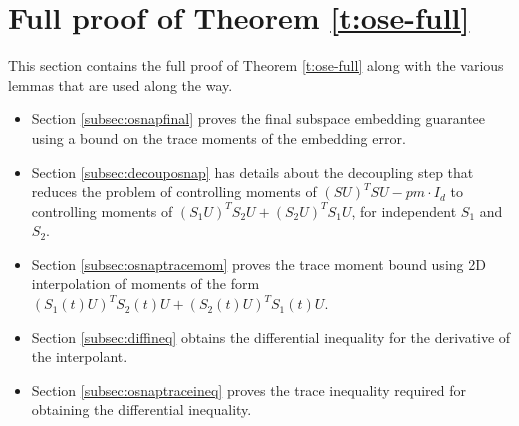 \documentclass[11pt]{amsart}
\numberwithin{equation}{section}
\numberwithin{equation}{section}
\theoremstyle{remark}
\theoremstyle{definition}
\begin{document}
 \section{Full proof of Theorem \ref{t:ose-full}}\label{sec:osnap-proof}

This section contains the full proof of Theorem  \ref{t:ose-full} along with the various lemmas that are used along the way.

\begin{itemize}
    \item Section \ref{subsec:osnapfinal} proves the final subspace embedding guarantee using a bound on the trace moments of the embedding error.
    \item Section \ref{subsec:decouposnap} has details about the decoupling step that reduces the problem of controlling moments of $(SU)^TSU - pm\cdot I_d$ to controlling moments of $(S_1U)^TS_2U+(S_2U)^TS_1U$, for independent $S_1$ and $S_2$.
    \item Section \ref{subsec:osnaptracemom} proves the trace moment bound using 2D interpolation of moments of the form $(S_1(t)U)^TS_2(t)U+(S_2(t)U)^TS_1(t)U$.
    \item Section \ref{subsec:diffineq} obtains the differential inequality for the derivative of the interpolant.
    \item Section \ref{subsec:osnaptraceineq} proves the trace inequality required for obtaining the differential inequality.
\end{itemize}
\end{document}
